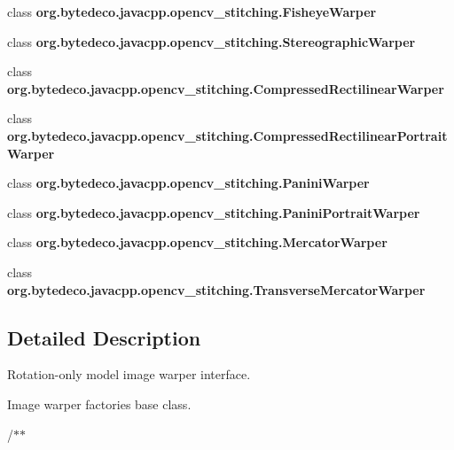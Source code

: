 \begin{DoxyCompactItemize}
class {\bfseries org.\+bytedeco.\+javacpp.\+opencv\+\_\+stitching.\+Fisheye\+Warper}
\item 
class {\bfseries org.\+bytedeco.\+javacpp.\+opencv\+\_\+stitching.\+Stereographic\+Warper}
\item 
class {\bfseries org.\+bytedeco.\+javacpp.\+opencv\+\_\+stitching.\+Compressed\+Rectilinear\+Warper}
\item 
class {\bfseries org.\+bytedeco.\+javacpp.\+opencv\+\_\+stitching.\+Compressed\+Rectilinear\+Portrait\+Warper}
\item 
class {\bfseries org.\+bytedeco.\+javacpp.\+opencv\+\_\+stitching.\+Panini\+Warper}
\item 
class {\bfseries org.\+bytedeco.\+javacpp.\+opencv\+\_\+stitching.\+Panini\+Portrait\+Warper}
\item 
class {\bfseries org.\+bytedeco.\+javacpp.\+opencv\+\_\+stitching.\+Mercator\+Warper}
\item 
class {\bfseries org.\+bytedeco.\+javacpp.\+opencv\+\_\+stitching.\+Transverse\+Mercator\+Warper}
\end{DoxyCompactItemize}


\subsection{Detailed Description}
Rotation-\/only model image warper interface. 

Image warper factories base class.

/$\ast$$\ast$ 